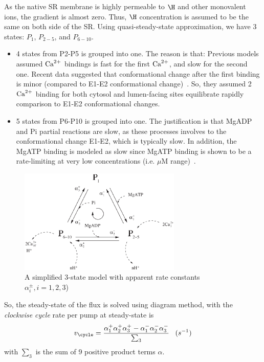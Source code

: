 As the native SR membrane is highly permeable to $\H$ and other
monovalent ions, the gradient is almost zero. Thus, $\H$ concentration
is assumed to be the same on both side of the SR.  Using
quasi-steady-state approximation, we have 3 states: $P_1$, $P_{2-5}$,
and $P_{6-10}$.
\begin{itemize}
\item 4 states from P2-P5 is grouped into one. The reason is that:
  Previous models assumed ${\text{Ca}^{2+}}$ bindings is fast for the first ${\text{Ca}^{2+}}$,
  and slow for the second one. Recent data suggested that
  conformational change after the first binding is minor (compared to
  E1-E2 conformational change)~\citep{tanford1987}. So, they assumed 2
  ${\text{Ca}^{2+}}$ binding for both cytosol and lumen-facing sites equilibrate
  rapidly comparison to E1-E2 conformational changes.

\item 5 states from P6-P10 is grouped into one. The justification is
  that MgADP and Pi partial reactions are slow, as these processes
  involves to the conformational change E1-E2, which is typically
  slow. In addition, the MgATP binding is modeled as slow since MgATP
  binding is shown to be a rate-limiting at very low concentrations
  (i.e. $\mu$M range)~\citep{mintz1997}.

\end{itemize}


\begin{figure}[hbt]
  \centerline{\includegraphics[height=5cm,
    angle=0]{./images/Tran_3state.eps}}
\caption{A simplified 3-state model with apparent rate constants
  $\alpha_i^\pm, i=1,2,3$)}
\label{fig:Tran_3state}
\end{figure}  
  
So, the steady-state of the flux is solved using diagram
method,
with the {\it clockwise cycle} rate per pump at steady-state is
\begin{equation}
  \label{eq:987}
  v_\cycle = \frac{\alpha^+_1\alpha^+_2\alpha^+_3-\alpha^-_1\alpha^-_2\alpha^-_3}{\sum_3} \;\;\; (s^{-1})
\end{equation}
with $\sum_3$ is the sum of 9 positive product terms $\alpha$.

